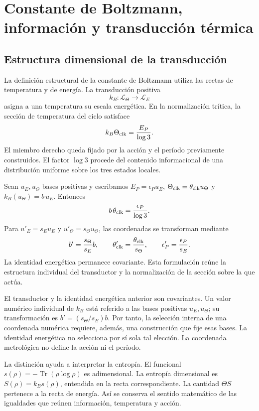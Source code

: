 \section{Constante de Boltzmann, información y transducción térmica}
\label{ii:sec:ii-boltzmann}

\subsection{Estructura dimensional de la transducción}

La definición estructural de la constante de Boltzmann utiliza las
rectas de temperatura y de energía. La transducción positiva
\[
 k_B:\mathcal L_\Theta\longrightarrow\mathcal L_E
\]
asigna a una temperatura su escala energética. En la normalización
trítica, la sección de temperatura del ciclo satisface
\[
 k_B\Theta_{\rm clk}=\frac{E_P}{\log3}.
\]
El miembro derecho queda fijado por la acción y el período previamente
construidos. El factor \(\log3\) procede del contenido informacional
de una distribución uniforme sobre los tres estados locales.

Sean \(u_E,u_\Theta\) bases positivas y escribamos
\(E_P=\epsilon_Pu_E\), \(\Theta_{\rm clk}=\theta_{\rm clk}u_\Theta\)
y \(k_B(u_\Theta)=b\,u_E\). Entonces
\[
 b\,\theta_{\rm clk}=\frac{\epsilon_P}{\log3}.
\]
Para \(u'_E=s_Eu_E\) y \(u'_\Theta=s_\Theta u_\Theta\),
las coordenadas se transforman mediante
\[
 b'=\frac{s_\Theta}{s_E}b,\qquad
 \theta'_{\rm clk}=\frac{\theta_{\rm clk}}{s_\Theta},\qquad
 \epsilon'_P=\frac{\epsilon_P}{s_E}.
\]
La identidad energética permanece covariante. Esta formulación reúne
la estructura individual del transductor y la normalización de la
sección sobre la que actúa.

\begin{remark}
El transductor y la identidad energética anterior son covariantes.
Un valor numérico individual de \(k_B\) está referido a las bases positivas
\(u_E,u_\Theta\); su transformación es \(b'=(s_\Theta/s_E)b\).
Por tanto, la selección interna de una coordenada numérica requiere,
además, una construcción que fije esas bases. La identidad energética
no selecciona por sí sola tal elección. La coordenada metrológica
no define la acción ni el período.
\end{remark}

La distinción ayuda a interpretar la entropía. El funcional
\(s(\rho)=-\operatorname{Tr}(\rho\log\rho)\) es adimensional.
La entropía dimensional es \(S(\rho)=k_Bs(\rho)\), entendida en
la recta correspondiente. La cantidad \(\Theta S\) pertenece a
la recta de energía. Así se conserva el sentido matemático de las
igualdades que reúnen información, temperatura y acción.


